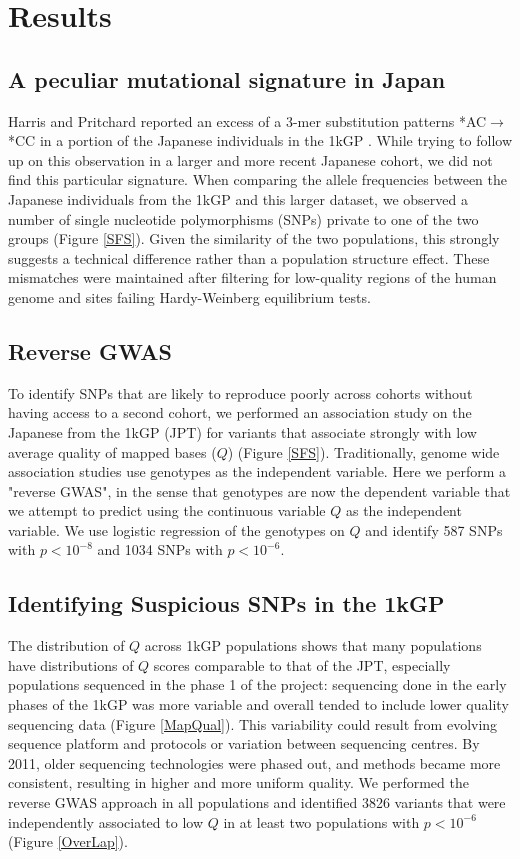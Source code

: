 \documentclass[
11pt, %
oneside, %
english, %
doublespacing, %
headsepline, %
chapterinoneline, %
]{MastersDoctoralThesis} %
\begin{document}
\section{Results}
\subsection{A peculiar mutational signature in Japan}
Harris and Pritchard reported an excess of a 3-mer substitution patterns *AC${\rightarrow}$*CC in a portion of the Japanese individuals in the 1kGP \citep{Harris2017a}.
While trying to follow up on this observation in a larger and more recent Japanese cohort, we did not find this particular signature.
When comparing the allele frequencies between the Japanese individuals from the 1kGP and this larger dataset, we observed a number of single nucleotide polymorphisms (SNPs) private to one of the two groups (Figure \ref{SFS}).
Given the similarity of the two populations, this strongly suggests a technical difference rather than a population structure effect.
These mismatches were maintained after filtering for low-quality regions of the human genome and sites failing Hardy-Weinberg equilibrium tests.
\subsection{Reverse GWAS}
To identify SNPs that are likely to reproduce poorly across cohorts without having access to a second cohort, we performed an association study on the Japanese from the 1kGP (JPT) for variants that associate strongly with low average quality of mapped bases ($Q$) (Figure \ref{SFS}).
Traditionally, genome wide association studies use genotypes as the independent variable. 
Here we perform a "reverse GWAS", in the sense that genotypes are now the dependent variable that we attempt to predict using the continuous variable $Q$ as the independent variable.
We use logistic regression of the genotypes on $Q$ and identify 587 SNPs with $p < 10^{-8}$ and 1034 SNPs with $ p < 10^{-6}$.

\subsection{Identifying Suspicious SNPs in the 1kGP}
The distribution of $Q$ across 1kGP populations shows that many populations have distributions of $Q$ scores comparable to that of the JPT, especially populations sequenced in the phase 1 of the project: sequencing done in the early phases of the 1kGP was more variable and overall tended to include lower quality sequencing data (Figure \ref{MapQual}).
This variability could result from evolving sequence platform and protocols or variation between sequencing centres. 
By 2011, older sequencing technologies were phased out, and methods became more consistent, resulting in higher and more uniform quality.
We performed the reverse GWAS approach in all populations and identified 3826 variants that were independently associated to low $Q$ in at least two populations with $ p < 10^{-6}$ (Figure \ref{OverLap}). 
\end{document}
